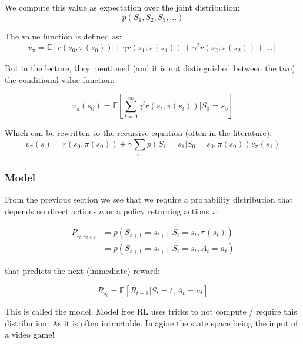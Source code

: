 \documentclass[main]{subfiles}
\begin{document}
We compute this value as expectation over the joint distribution:
\begin{equation}
p(S_{1}, S_{2}, S_{3}, \dots)
\end{equation}

The value function is defined as: 
\begin{equation}
    v_{\pi} = \mathbb{E}[r(s_0, \pi(s_0)) + \gamma r(s_1, \pi(s_1)) + \gamma^2 r(s_2, \pi(s_2)) + \dots]
\end{equation}

But in the  lecture, they mentioned (and it is not distinguished between the two) the conditional value function:

\begin{equation}
    v_{\pi}(s_0) = \mathbb{E}[\sum_{t=0}^\infty \gamma^t r(s_t, \pi(s_t)) | S_0 = s_0]
\end{equation}

Which can be rewritten to the recursive equation (often in the literature):
\begin{equation}
v_{\pi}(s) = r(s_0, \pi(s_0)) + \gamma \sum_{s_1} p(S_1 =s_1 | S_0 = s_0, \pi(s_0)) v_\pi (s_1)
\end{equation}

\subsubsection{Model}
From the previous section we see that we require a probability distribution that depends on direct actions $a$ or a policy returning actions $\pi$:

\begin{align}
    P_{s_t,s_{t+1}} &= p(S_{t+1} = s_{t+1} | S_t = s_t, \pi(s_t)) \\
                    &= p(S_{t+1} = s_{t+1} | S_t = s_t, A_t = a_t)
\end{align}

that predicts the next (immediate) reward:

\begin{equation}
    R_{s_t} = \mathbb{E}[R_{t+1} | S_t = t, A_t = a_t]
\end{equation}

This is called the model. Model free RL uses tricks to not compute / require this distribution. As it is often intractable. Imagine the state space being the  input of a video game!
\end{document}
